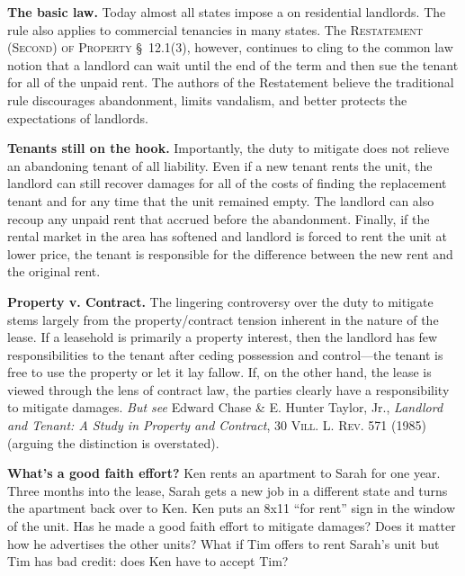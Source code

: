 
\item \textbf{The basic law.}  Today almost all states impose a 
on residential landlords.  The rule also applies to commercial tenancies in
many states.  The \textsc{Restatement (Second) of Property} \S~12.1(3), however,
continues to cling to the common law notion that a landlord can wait until the
end of the term and then sue the tenant for all of the unpaid rent.  The
authors of the Restatement believe the traditional rule discourages
abandonment, limits vandalism, and better protects the expectations of
landlords.  


\item \textbf{Tenants still on the hook.}  Importantly, the duty to mitigate
does not relieve an abandoning tenant of all liability.  Even if a new tenant
rents the unit, the landlord can still recover damages for all of the costs of
finding the replacement tenant and for any time that the unit remained empty.
The landlord can also recoup any unpaid rent that accrued before the
abandonment.  Finally, if the rental market in the area has softened and
landlord is forced to rent the unit at lower price, the tenant is responsible
for the difference between the new rent and the original rent.


\item \textbf{Property v. Contract.} The lingering controversy over the duty to
mitigate stems largely from the property/contract tension inherent in the
nature of the lease.  If a leasehold is primarily a property interest, then the
landlord has few responsibilities to the tenant after ceding possession and
control---the tenant is free to use the property or let it lay fallow.  If, on
the other hand, the lease is viewed through the lens of contract law, the
parties clearly have a responsibility to mitigate damages.  \textit{But see}
Edward Chase \& E. Hunter Taylor, Jr., \textit{Landlord and Tenant: A Study in
Property and Contract}, \textsc{30 Vill. L. Rev.} 571 (1985) (arguing the
distinction is overstated).


\item \textbf{What's a good faith effort?} Ken rents an apartment to Sarah for
one year.  Three months into the lease, Sarah gets a new job in a different
state and turns the apartment back over to Ken.  Ken puts an 8x11 ``for rent''
sign in the window of the unit.  Has he made a good faith effort to mitigate
damages? Does it matter how he advertises the other units? What if Tim offers
to rent Sarah's unit but Tim has bad credit: does Ken have to accept Tim?


